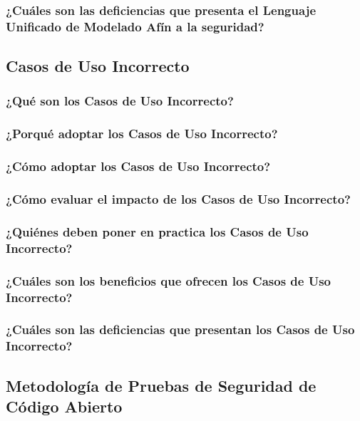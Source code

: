 \documentclass[runningheads,a4paper]{llncs}
\begin{document}
\subsubsection{¿Cuáles son las deficiencias que presenta el Lenguaje Unificado de Modelado Afín a la seguridad?}


\subsection{Casos de Uso Incorrecto}

\subsubsection{¿Qué son los Casos de Uso Incorrecto?}

\subsubsection{¿Porqué adoptar los Casos de Uso Incorrecto?}

\subsubsection{¿Cómo adoptar los Casos de Uso Incorrecto?}

\subsubsection{¿Cómo evaluar el impacto de los Casos de Uso Incorrecto?}

\subsubsection{¿Quiénes deben poner en practica los Casos de Uso Incorrecto?}

\subsubsection{¿Cuáles son los beneficios que ofrecen los Casos de Uso Incorrecto?}

\subsubsection{¿Cuáles son las deficiencias que presentan los Casos de Uso Incorrecto?}


\subsection{Metodología de Pruebas de Seguridad de Código Abierto}
\end{document}
